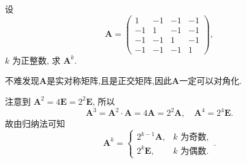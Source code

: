 \documentclass[../../main.tex]{subfiles}
\begin{document}
\begin{example}
设
\[
\boldsymbol{A} = \begin{pmatrix} 1 & -1 & -1 & -1 \\ -1 & 1 & -1 & -1 \\ -1 & -1 & 1 & -1 \\ -1 & -1 & -1 & 1 \end{pmatrix},
\]
\(k\) 为正整数, 求 \(\boldsymbol{A}^k\).
\end{example}
\begin{remark}
不难发现$\boldsymbol{A}$是实对称矩阵,且是正交矩阵,因此$\boldsymbol{A}$一定可以对角化.
\end{remark}
\begin{solution}
注意到 \(\boldsymbol{A}^2 = 4\boldsymbol{E} = 2^2\boldsymbol{E}\), 所以
\[
\boldsymbol{A}^3 = \boldsymbol{A}^2 \cdot \boldsymbol{A} = 4\boldsymbol{A} = 2^2\boldsymbol{A}, \quad \boldsymbol{A}^4 = 2^4\boldsymbol{E}.
\]
故由归纳法可知
\[
\boldsymbol{A}^k = \begin{cases} 2^{k - 1}\boldsymbol{A}, & k \text{ 为奇数}, \\ 2^k\boldsymbol{E}, & k \text{ 为偶数}. \end{cases}.
\]

\end{solution}
\end{document}
